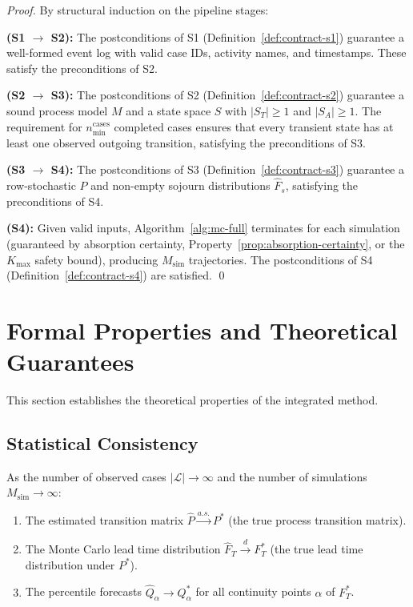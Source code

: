 \begin{proof}
By structural induction on the pipeline stages:

\textbf{(S1 $\to$ S2):} The postconditions of S1 
(Definition~\ref{def:contract-s1}) guarantee a well-formed event log 
with valid case IDs, activity names, and timestamps. These satisfy the 
preconditions of S2.

\textbf{(S2 $\to$ S3):} The postconditions of S2 
(Definition~\ref{def:contract-s2}) guarantee a sound process model $M$ 
and a state space $S$ with $|S_T| \geq 1$ and $|S_A| \geq 1$. The 
requirement for $n_{\min}^{\text{cases}}$ completed cases ensures that 
every transient state has at least one observed outgoing transition, 
satisfying the preconditions of S3.

\textbf{(S3 $\to$ S4):} The postconditions of S3 
(Definition~\ref{def:contract-s3}) guarantee a row-stochastic $P$ and 
non-empty sojourn distributions $\hat{F}_s$, satisfying the preconditions 
of S4.

\textbf{(S4):} Given valid inputs, Algorithm~\ref{alg:mc-full} terminates 
for each simulation (guaranteed by absorption certainty, 
Property~\ref{prop:absorption-certainty}, or the $K_{\max}$ safety bound), 
producing $M_{\text{sim}}$ trajectories. The postconditions of S4 
(Definition~\ref{def:contract-s4}) are satisfied. \qed
\end{proof}


\section{Formal Properties and Theoretical Guarantees}
\label{sec:method-properties}

This section establishes the theoretical properties of the integrated method.

\subsection{Statistical Consistency}
\label{sec:prop-consistency}

\begin{theorem}
\label{thm:consistency}
As the number of observed cases $|\mathcal{L}| \to \infty$ and the 
number of simulations $M_{\text{sim}} \to \infty$:
\begin{enumerate}
    \item The estimated transition matrix $\hat{P} \xrightarrow{a.s.} P^*$ 
    (the true process transition matrix).
    \item The Monte Carlo lead time distribution 
    $\hat{F}_T \xrightarrow{d} F_T^*$ (the true lead time distribution 
    under $P^*$).
    \item The percentile forecasts $\hat{Q}_\alpha \to Q_\alpha^*$ for 
    all continuity points $\alpha$ of $F_T^*$.
\end{enumerate}
\end{theorem}

